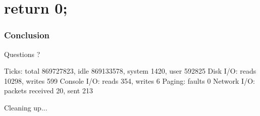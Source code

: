 \documentclass{beamer}
\begin{document}
\section*{return 0;}

\begin{frame}[fragile]
  \frametitle{Conclusion}
\begin{verbaterm}[fontsize=\scriptsize]
Questions ?

Ticks: total 869727823, idle 869133578, system 1420, user 592825
Disk I/O: reads 10298, writes 599
Console I/O: reads 354, writes 6
Paging: faults 0
Network I/O: packets received 20, sent 213

Cleaning up...
\end{verbaterm}

\end{frame}
\end{document}

